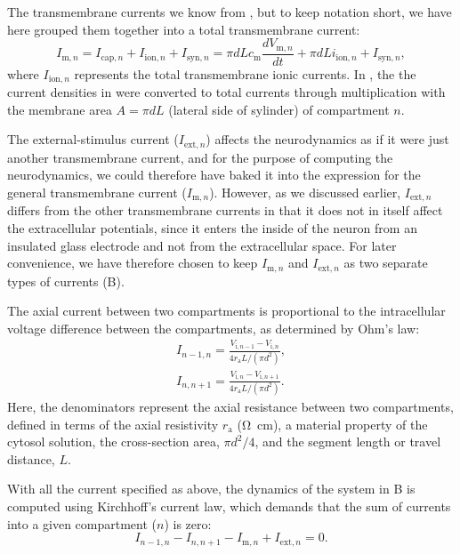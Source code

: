 The transmembrane currents we know from , but to keep notation short, we have 
here grouped them together into a total transmembrane current:
\begin{equation}
I_{\mathrm{m},n} = I_{\mathrm{cap},n} + I_{\mathrm{ion},n} + I_{\mathrm{syn},n} = \pi d L c_\text{m} \frac{dV_{\mathrm{m},n}}{dt} + \pi d L i_{\mathrm{ion},n}  + I_{\mathrm{syn},n}, 
\label{eq:Neuron:Imemb}
\end{equation}
where $I_{\mathrm{ion},n}$ represents the total transmembrane ionic currents. In , the the current densities in  were converted to total currents through multiplication with the membrane area $A=\pi d L$ (lateral side of sylinder) of compartment $n$.

The external-stimulus current ($I_{\mathrm{ext},n}$) affects the neurodynamics as if it were just another transmembrane current, and for the purpose of computing the neurodynamics, we could therefore have baked it into the expression for the general transmembrane current ($I_{\mathrm{m},n}$). However, as we discussed earlier, $I_{\mathrm{ext},n}$ differs from the other transmembrane currents in that it does not in itself affect the extracellular potentials, since it enters the inside of the neuron from an insulated glass electrode and not from the extracellular space. For later convenience, we have therefore chosen to keep $I_{\mathrm{m},n}$ and $I_{\mathrm{ext},n}$ as two separate types of currents (B). 

The axial current between two compartments is proportional to the intracellular voltage difference between the compartments, as determined by Ohm's law:
\begin{eqnarray}
I_{n-1,n} = \frac{V_{\mathrm{i},n-1}-V_{\mathrm{i},n}}{4 r_\text{a} L/(\pi d^2)}, \nonumber \\ 
I_{n,n+1} = \frac{V_{\mathrm{i},n}-V_{\mathrm{i},n+1}}{4 r_\text{a} L/(\pi d^2)}.
\label{eq:Neuron:axialcurrents}
\end{eqnarray}
Here, the denominators represent the axial resistance between two compartments, defined in terms of the axial resistivity $r_\text{a}$ (\si{\ohm\centi\metre}), a material property of the cytosol solution, the cross-section area, $\pi d^2/4$, and the segment length or travel distance, $L$. 

With all the current specified as above, the dynamics of the system in B  is computed using Kirchhoff's current law, which demands that the sum of currents into a given compartment ($n$) is zero:
\begin{equation}
I_{n-1,n} - I_{n,n+1} - I_{\mathrm{m},n} + I_{\mathrm{ext},n} = 0.
\label{eq:Neuron:Kirch}
\end{equation}

